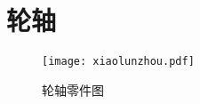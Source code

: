 \chapter{轮轴}
\noindent
\begin{figure}[htbp]
\centering
\texttt{[image: xiaolunzhou.pdf]}
\caption{轮轴零件图}\label{fig:xiaolunzhou}
\end{figure}
\endinput